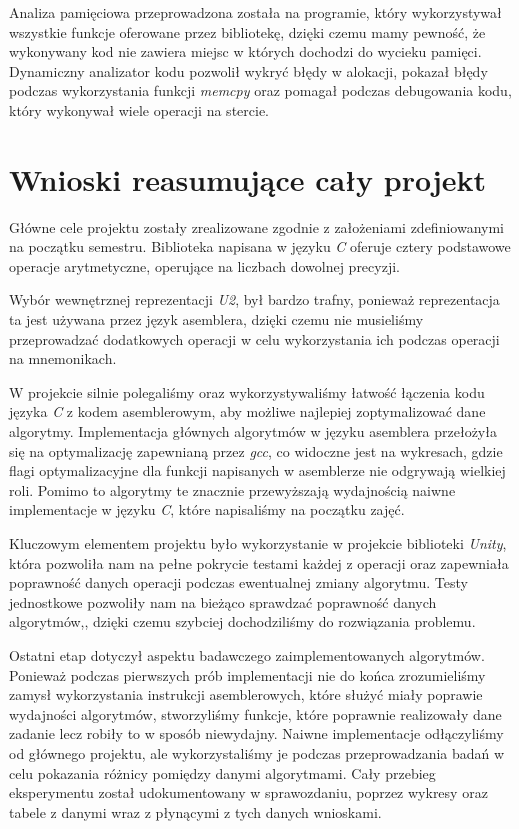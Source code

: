 \documentclass{article}
\begin{document}
Analiza pamięciowa przeprowadzona została na programie, który wykorzystywał wszystkie funkcje oferowane przez bibliotekę, dzięki czemu mamy pewność, że wykonywany kod nie zawiera miejsc w których dochodzi do wycieku pamięci. Dynamiczny analizator kodu pozwolił wykryć błędy w alokacji, pokazał błędy podczas wykorzystania funkcji \textit{memcpy} oraz pomagał podczas debugowania kodu, który wykonywał wiele operacji na stercie.

\clearpage

\section{Wnioski reasumujące cały projekt}

Główne cele projektu zostały zrealizowane zgodnie z założeniami zdefiniowanymi na początku semestru. Biblioteka napisana w języku \textit{C} oferuje cztery podstawowe operacje arytmetyczne, operujące na liczbach dowolnej precyzji. 

Wybór wewnętrznej reprezentacji \textit{U2}, był bardzo trafny, ponieważ reprezentacja ta jest używana przez język asemblera, dzięki czemu nie musieliśmy przeprowadzać dodatkowych operacji w celu wykorzystania ich podczas operacji na mnemonikach. 

W projekcie silnie polegaliśmy oraz wykorzystywaliśmy łatwość łączenia kodu języka \textit{C} z kodem asemblerowym, aby możliwe najlepiej zoptymalizować dane algorytmy. Implementacja głównych algorytmów w języku asemblera przełożyła się na optymalizację zapewnianą przez \textit{gcc}, co widoczne jest na wykresach, gdzie flagi optymalizacyjne dla funkcji napisanych w asemblerze nie odgrywają wielkiej roli. Pomimo to algorytmy te znacznie przewyższają wydajnością naiwne implementacje w języku \textit{C}, które napisaliśmy na początku zajęć.

Kluczowym elementem projektu było wykorzystanie w projekcie biblioteki \textit{Unity}, która pozwoliła nam na pełne pokrycie testami każdej z operacji oraz zapewniała poprawność danych operacji podczas ewentualnej zmiany algorytmu. Testy jednostkowe pozwoliły nam na bieżąco sprawdzać poprawność danych algorytmów,, dzięki czemu szybciej dochodziliśmy do rozwiązania problemu.

Ostatni etap dotyczył aspektu badawczego zaimplementowanych algorytmów. Ponieważ podczas pierwszych prób implementacji nie do końca zrozumieliśmy zamysł wykorzystania instrukcji asemblerowych, które służyć miały poprawie wydajności algorytmów, stworzyliśmy funkcje, które poprawnie realizowały dane zadanie lecz robiły to w sposób niewydajny. Naiwne implementacje odłączyliśmy od głównego projektu, ale wykorzystaliśmy je podczas przeprowadzania badań w celu pokazania różnicy pomiędzy danymi algorytmami. Cały przebieg eksperymentu został udokumentowany w sprawozdaniu, poprzez wykresy oraz tabele z danymi wraz z płynącymi z tych danych wnioskami.
\end{document}
